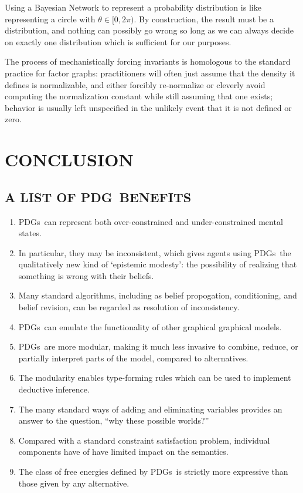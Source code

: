 \documentclass{article}
\newcommand{\MN}{PDG}
\newcommand{\MNs}{\MN s}
\numberwithin{equation}{section}
\begin{document}
\begin{vfull}
		Using a Bayesian Network to represent a probability distribution is like representing a circle with $\theta \in [0, 2\pi)$.
		By construction, the result must be a distribution, and nothing can possibly go wrong so long as we can always decide on exactly one distribution which is sufficient for our purposes.
		
		
		The process of mechanistically forcing invariants is homologous to the standard practice for factor graphs: practitioners will often just assume that the density it defines is normalizable, and either forcibly re-normalize or cleverly avoid computing the normalization constant while still assuming that one exists; behavior is usually left unspecified in the unlikely event that it is not defined or zero.
	\end{vfull}
	
	\section{CONCLUSION}
	\subsection{A LIST OF \MN\ BENEFITS}\label{sec:list-of-benefits}
	\begin{enumerate}[nosep]
		\item \MNs\ can represent both over-constrained and under-constrained mental states. 
		\item In particular, they may be inconsistent, which gives agents using \MNs\ the qualitatively new kind of `epistemic modesty': the possibility of realizing that something is wrong with their beliefs.
		\item Many standard algorithms, including as belief propogation, conditioning, and belief revision, can be regarded as resolution of inconsistency.
		\item \MNs\ can emulate the functionality of other graphical graphical models.
		\item \MNs\ are more modular, making it much less invasive to combine, reduce, or partially interpret parts of the model, compared to alternatives.
		\item The modularity enables type-forming rules which can be used to implement deductive inference.
		\item The many standard ways of adding and eliminating variables provides an answer to the question, ``why these possible worlds?''
		\item Compared with a standard constraint satisfaction problem, individual components have of have limited impact on the semantics.
		\item The class of free energies defined by \MNs\ is strictly more expressive than those given by any alternative.
	\end{enumerate} %
	
\end{document}
